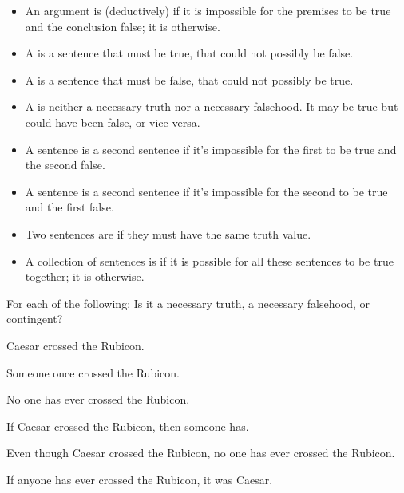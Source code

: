 \begin{itemize}
\item An argument is (deductively)  if it is impossible for the premises to be true and the conclusion false; it is  otherwise.

\item A  is a sentence that must be true, that could not possibly be false.

\item A  is a sentence that must be false, that could not possibly be true.

\item A  is neither a necessary truth nor a necessary falsehood. It may be true but could have been false, or vice versa.

\item A sentence is  a second sentence if it's impossible for the first to be true and the second false. 

\item A sentence is  a second sentence if it's impossible for the second to be true and the first false. 

\item Two sentences are  if they must have the same truth value.

\item A collection of sentences is  if it is possible for all these sentences to be true together; it is  otherwise.
\end{itemize}


\practiceproblems
\problempart
\label{pr.EnglishTautology2}
For each of the following: Is it a necessary truth, a necessary falsehood, or contingent?
\begin{earg}
\item Caesar crossed the Rubicon.
\item Someone once crossed the Rubicon.
\item No one has ever crossed the Rubicon.
\item If Caesar crossed the Rubicon, then someone has.
\item Even though Caesar crossed the Rubicon, no one has ever crossed the Rubicon.
\item If anyone has ever crossed the Rubicon, it was Caesar.
\end{earg}

